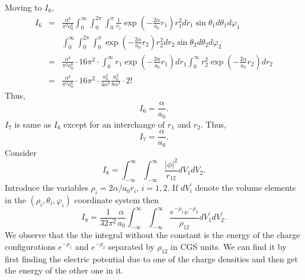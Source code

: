 \documentclass{article}
\numberwithin{equation}{section}
\begin{document}
Moving to $I_6$,
\begin{eqnarray*}
I_6 &=& \frac{\alpha^6}{\pi^2 a_0^6}
\int_0^\infty\int_0^{2\pi}\int_0^\pi
\frac{1}{r_1}\exp\left(-\frac{2\alpha}{a_0}r_1\right)
r_1^2dr_1\sin\theta_1d\theta_1d\varphi_1 \\
 & & 
\int_0^\infty\int_0^{2\pi}\int_0^\pi
\exp\left(-\frac{2\alpha}{a_0}r_2\right)
r_2^2dr_2\sin\theta_2d\theta_2d\varphi_2 \\
&=& \frac{\alpha^6}{\pi^2 a_0^6} \cdot 16\pi^2 \cdot
\int_0^\infty r_1\exp\left(-\frac{2\alpha}{a_0}r_1\right)dr_1
\int_0^\infty r_2^2\exp\left(-\frac{2\alpha}{a_0}r_2\right)dr_2 \\
&=& \frac{\alpha^6}{\pi^2 a_0^6} \cdot 16\pi^2 \cdot
\frac{a_0^2}{4\alpha^2}\frac{a_0^3}{8\alpha^3}\cdot 2!
\end{eqnarray*}
Thus,
\begin{equation}\label{s5e78}
I_6 = \frac{\alpha}{a_0}.
\end{equation}
$I_7$ is same as $I_6$ except for an interchange of $r_1$ and $r_2$. Thus,
\begin{equation}\label{s5e79}
I_7 = \frac{\alpha}{a_0}.
\end{equation}
Consider
\[
I_8 = \int_{-\infty}^\infty\int_{-\infty}^\infty\frac{|\phi|^2}{r_{12}}
dV_1 dV_2.
\]
Introduce the variables $\rho_i = 2\alpha/a_0 r_i$, $i = 1, 2$. If 
$dV_i^\prime$ denote the volume elements in the $(\rho_i, \theta_i, 
\varphi_i)$ coordinate system then
\[
I_8 = \frac{1}{32\pi^2}\frac{\alpha}{a_0}
\int_{-\infty}^\infty\int_{-\infty}^\infty
\frac{e^{-\rho_1}e^{-\rho_2}}{\rho_{12}}dV^\prime_1 dV^\prime_2.
\]
We observe that the the integral without the constant is the energy of
the charge configurations $e^{-\rho_1}$ and $e^{-\rho_2}$ separated by
$\rho_{12}$ in CGS units. We can find it by first finding the electric
potential due to one of the charge densities and then get the energy of
the other one in it.
\end{document}
